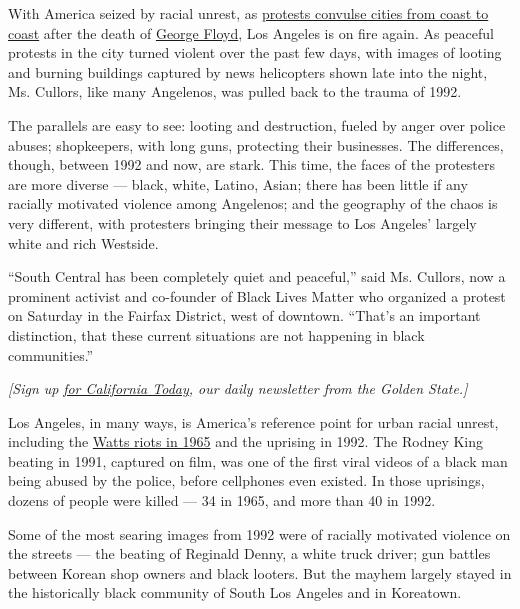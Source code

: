 With America seized by racial unrest, as
\href{https://www.nytimes3xbfgragh.onion/2020/06/02/us/protester-profiles-floyd-minneapolis.html}{protests
convulse cities from coast to coast} after the death of
\href{https://www.nytimes3xbfgragh.onion/article/george-floyd-autopsy-michael-baden.html}{George
Floyd}, Los Angeles is on fire again. As peaceful protests in the city
turned violent over the past few days, with images of looting and
burning buildings captured by news helicopters shown late into the
night, Ms. Cullors, like many Angelenos, was pulled back to the trauma
of 1992.

The parallels are easy to see: looting and destruction, fueled by anger
over police abuses; shopkeepers, with long guns, protecting their
businesses. The differences, though, between 1992 and now, are stark.
This time, the faces of the protesters are more diverse --- black,
white, Latino, Asian; there has been little if any racially motivated
violence among Angelenos; and the geography of the chaos is very
different, with protesters bringing their message to Los Angeles'
largely white and rich Westside.

``South Central has been completely quiet and peaceful,'' said Ms.
Cullors, now a prominent activist and co-founder of Black Lives Matter
who organized a protest on Saturday in the Fairfax District, west of
downtown. ``That's an important distinction, that these current
situations are not happening in black communities.''

\emph{{[}Sign up}
\href{https://www.nytimes3xbfgragh.onion/newsletters/california-today}{\emph{for
California Today}}\emph{, our daily newsletter from the Golden
State.{]}}

Los Angeles, in many ways, is America's reference point for urban racial
unrest, including the
\href{https://www.nytimes3xbfgragh.onion/2015/08/11/us/50-years-after-watts-riots-a-recovery-is-in-progress.html}{Watts
riots in 1965} and the uprising in 1992. The Rodney King beating in
1991, captured on film, was one of the first viral videos of a black man
being abused by the police, before cellphones even existed. In those
uprisings, dozens of people were killed --- 34 in 1965, and more than 40
in 1992.

Some of the most searing images from 1992 were of racially motivated
violence on the streets --- the beating of Reginald Denny, a white truck
driver; gun battles between Korean shop owners and black looters. But
the mayhem largely stayed in the historically black community of South
Los Angeles and in Koreatown.

